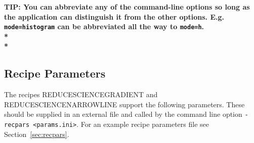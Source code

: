 \documentclass[twoside,11pt]{article}
\newcommand{\htmlref}[2]{#1}
\newcommand{\latexhtml}[2]{#1}
\newcommand{\xlabel}[1]{}
\renewcommand{\_}{\texttt{\symbol{95}}}
\newcommand{\param}[1]{\texttt{#1}}
\newcommand{\cref}[3]{\latexhtml{#1~\ref{#2}}{\htmlref{#3}{#2}}}
\begin{document}
\begin{htmlonly}
\textbf{TIP: You can abbreviate any of the command-line options so long as the application can distinguish it from the other options. E.g. \param{mode=histogram} can be abbreviated all the way to \param{mode=h}.\\*\\*}
\end{htmlonly}


\newpage
\subsection{\xlabel{params}Recipe Parameters}
\label{app:params}
The recipes REDUCE\_SCIENCE\_GRADIENT and REDUCE\_SCIENCE\_NARROWLINE support the following parameters. These should be supplied in an external file and called by the command line option \param{-recpars <params.ini>}. For an example recipe parameters file see \cref{Section}{sec:recpars}{Setting recipe parameters}.
\\
\end{document}
